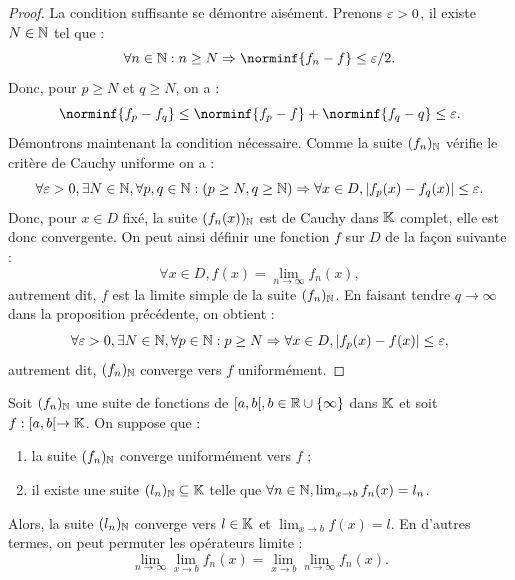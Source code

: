 \documentclass{article}
\begin{document}
\begin{proof}
La condition suffisante se démontre aisément. Prenons $\varepsilon >0$, il existe $N \in \mathbb{N}$ tel que :
\[ \forall n \in \N : n \geq N \Rightarrow \norminf{f_n-f} \leq \veps/2. \]
Donc, pour $p \geq N$ et $q \geq N$, on a : 
\[ \norminf{f_p - f_q} \leq \norminf{f_p -f} + \norminf{f_q - q} \leq \veps . \] 
Démontrons maintenant la condition nécessaire. Comme la suite $(f_n)_{\mathbb{N}}$ vérifie le critère de Cauchy uniforme on a :
\[ \forall \varepsilon > 0, \exists N \in \mathbb{N}, \forall p,q \in \mathbb{N} :  (p \geq N, q \geq \mathbb{N}) \Rightarrow \forall x \in D, \lvert f_p(x) - f_q(x)\rvert \leq \varepsilon. \]
Donc, pour $x \in D$ fixé, la suite $(f_n(x))_{\mathbb{N}}$ est de Cauchy dans $\mathbb{K}$ complet, elle est donc convergente.
On peut ainsi définir une fonction $f$ sur $D$ de la façon suivante :
\[ \forall x \in D, f(x) = \lim_{n \to \infty} f_n(x) , \]
autrement dit, $f$ est la limite simple de la suite $(f_n)_{\mathbb{N}}$. En faisant tendre $q \to \infty$ dans la proposition précédente, on obtient :
\[ \forall \varepsilon > 0, \exists N \in \mathbb{N}, \forall p \in \mathbb{N} :  p \geq N \Rightarrow \forall x \in D, \lvert f_p(x) - f(x)\rvert \leq \varepsilon, \]
autrement dit, $(f_n)_{\mathbb{N}}$ converge vers $f$ uniformément.
\end{proof}

\begin{thm}
Soit $(f_n)_{\mathbb{N}}$ une suite de fonctions de $[a,b[, b \in \mathbb{R} \cup \{\infty\}$ dans $\mathbb{K}$ et soit $f:[a,b[ \to \mathbb{K}$. On suppose que :
\begin{enumerate}[label=(\roman*)]
\item la suite $(f_n)_{\mathbb{N}}$ converge uniformément vers $f$ ;
\item il existe une suite $(l_n)_{\mathbb{N}} \subseteq \mathbb{K}$ telle que $\forall n \in \mathbb{N}, \lim_{x \to b} f_n(x) = l_n$.
\end{enumerate}
Alors, la suite $(l_n)_{\mathbb{N}}$ converge vers $l \in \mathbb{K}$ et $\lim_{x \to b} f(x) = l$.
En d'autres termes, on peut permuter les opérateurs limite :
\[ \lim_{n \to \infty} \lim_{x \to b} f_n(x) = \lim_{x \to b} \lim_{n \to \infty} f_n(x) . \]
\end{thm}
\end{document}
